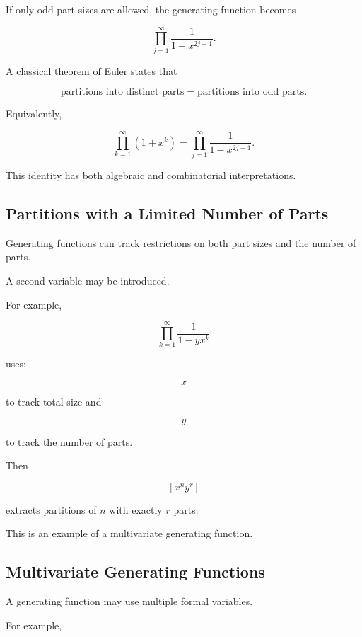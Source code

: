 If only odd part sizes are allowed, the generating function becomes

\[
\boxed{
\prod_{j=1}^{\infty}
\frac{1}{1-x^{2j-1}}.
}
\]

A classical theorem of Euler states that

\[
\boxed{
\text{partitions into distinct parts}
=
\text{partitions into odd parts}.
}
\]

Equivalently,

\[
\boxed{
\prod_{k=1}^{\infty}(1+x^k)
=
\prod_{j=1}^{\infty}
\frac{1}{1-x^{2j-1}}.
}
\]

This identity has both algebraic and combinatorial interpretations.

\subsection{Partitions with a Limited Number of Parts}
\label{subsec:partitions-limited-parts}

Generating functions can track restrictions on both part sizes and the
number of parts.

A second variable may be introduced.

For example,

\[
\prod_{k=1}^{\infty}
\frac{1}{1-yx^k}
\]

uses:

\[
x
\]

to track total size and

\[
y
\]

to track the number of parts.

Then

\[
[x^ny^r]
\]

extracts partitions of \(n\) with exactly \(r\) parts.

This is an example of a multivariate generating function.

\subsection{Multivariate Generating Functions}
\label{subsec:multivariate-generating-functions}

A generating function may use multiple formal variables.

For example,

